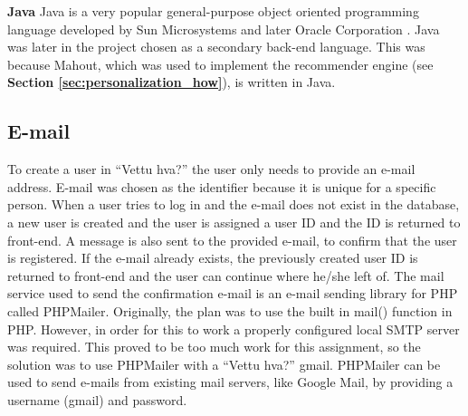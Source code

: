 \noindent\textbf{Java}\newline
Java is a very popular general-purpose object oriented programming language developed by Sun Microsystems and later Oracle Corporation \cite{HM9}. Java was later in the project chosen as a secondary back-end language. This was because Mahout, which was used to implement the recommender engine (see \textbf{Section \ref{sec:personalization_how}}), is written in Java. 


\subsection{E-mail}

To create a user in “Vettu hva?” the user only needs to provide an e-mail address. E-mail was chosen as the identifier because it is unique for a specific person. When a user tries to log in and the e-mail does not exist in the database, a new user is created and the user is assigned a user ID and the ID is returned to front-end. A message is also sent to the provided e-mail, to confirm that the user is registered. If the e-mail already exists, the previously created user ID is returned to front-end and the user can continue where he/she left of. The mail service used to send the confirmation e-mail is an e-mail sending library for PHP called PHPMailer. Originally, the plan was to use the built in mail() function in PHP. However, in order for this to work a properly configured local SMTP server was required. This proved to be too much work for this assignment, so the solution was to use PHPMailer with a “Vettu hva?” gmail. PHPMailer can be used to send e-mails from existing mail servers, like Google Mail, by providing a username (gmail) and password.

\cleardoublepage